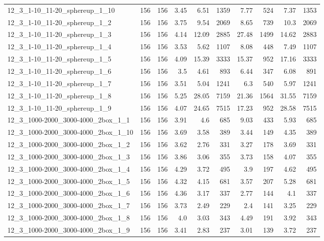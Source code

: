 \begin{center}
\begin{scriptsize}
\begin{longtable}{lrrrrrrrrr}
12\_3\_1-10\_11-20\_sphereup\_1\_10 & 156 & 156 & 3.45 & 6.51 & 1359 & 7.77 & 524 & 7.37 & 1353\\
12\_3\_1-10\_11-20\_sphereup\_1\_2 & 156 & 156 & 3.75 & 9.54 & 2069 & 8.65 & 739 & 10.3 & 2069\\
12\_3\_1-10\_11-20\_sphereup\_1\_3 & 156 & 156 & 4.14 & 12.09 & 2885 & 27.48 & 1499 & 14.62 & 2883\\
12\_3\_1-10\_11-20\_sphereup\_1\_4 & 156 & 156 & 3.53 & 5.62 & 1107 & 8.08 & 448 & 7.49 & 1107\\
12\_3\_1-10\_11-20\_sphereup\_1\_5 & 156 & 156 & 4.09 & 15.39 & 3333 & 15.37 & 952 & 17.16 & 3333\\
12\_3\_1-10\_11-20\_sphereup\_1\_6 & 156 & 156 & 3.5 & 4.61 & 893 & 6.44 & 347 & 6.08 & 891\\
12\_3\_1-10\_11-20\_sphereup\_1\_7 & 156 & 156 & 3.51 & 5.04 & 1241 & 6.3 & 540 & 5.97 & 1241\\
12\_3\_1-10\_11-20\_sphereup\_1\_8 & 156 & 156 & 5.25 & 28.05 & 7159 & 21.36 & 1564 & 31.55 & 7159\\
12\_3\_1-10\_11-20\_sphereup\_1\_9 & 156 & 156 & 4.07 & 24.65 & 7515 & 17.23 & 952 & 28.58 & 7515\\
12\_3\_1000-2000\_3000-4000\_2box\_1\_1 & 156 & 156 & 3.91 & 4.6 & 685 & 9.03 & 433 & 5.93 & 685\\
12\_3\_1000-2000\_3000-4000\_2box\_1\_10 & 156 & 156 & 3.69 & 3.58 & 389 & 3.44 & 149 & 4.35 & 389\\
12\_3\_1000-2000\_3000-4000\_2box\_1\_2 & 156 & 156 & 3.62 & 2.76 & 331 & 3.27 & 178 & 3.69 & 331\\
12\_3\_1000-2000\_3000-4000\_2box\_1\_3 & 156 & 156 & 3.86 & 3.06 & 355 & 3.73 & 158 & 4.07 & 355\\
12\_3\_1000-2000\_3000-4000\_2box\_1\_4 & 156 & 156 & 4.29 & 3.72 & 495 & 3.9 & 197 & 4.62 & 495\\
12\_3\_1000-2000\_3000-4000\_2box\_1\_5 & 156 & 156 & 4.32 & 4.15 & 681 & 3.57 & 207 & 5.28 & 681\\
12\_3\_1000-2000\_3000-4000\_2box\_1\_6 & 156 & 156 & 4.36 & 3.17 & 337 & 2.77 & 144 & 4.1 & 337\\
12\_3\_1000-2000\_3000-4000\_2box\_1\_7 & 156 & 156 & 3.73 & 2.49 & 229 & 2.4 & 141 & 3.25 & 229\\
12\_3\_1000-2000\_3000-4000\_2box\_1\_8 & 156 & 156 & 4.0 & 3.03 & 343 & 4.49 & 191 & 3.92 & 343\\
12\_3\_1000-2000\_3000-4000\_2box\_1\_9 & 156 & 156 & 3.41 & 2.83 & 237 & 3.01 & 139 & 3.72 & 237\\

\end{longtable}
\end{scriptsize}
\end{center}

